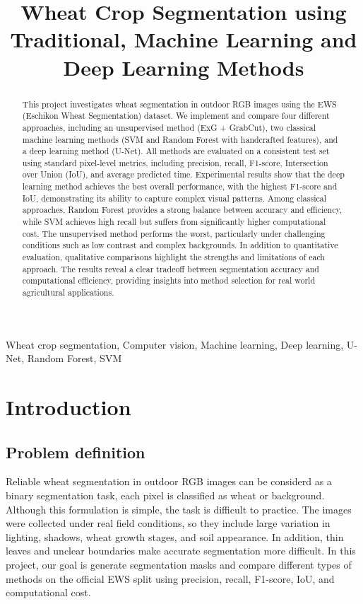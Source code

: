 \documentclass[conference]{IEEEtran}
\title{Wheat Crop Segmentation using Traditional, Machine Learning and Deep Learning Methods}
\author{

\IEEEauthorblockN{
Lucia Luo,
Yuze Chen,
Zi Wang,
Zhenhua Zhuo,
Zhiwei Gao
}
\IEEEauthorblockN{COMP9517, 26T1, UNSW}
\IEEEauthorblockN{z5465001, z5711364, z5518250, z5527323, z5542326@ad.unsw.edu.au}
}
\begin{document}
\maketitle

\begin{abstract}
This project investigates wheat segmentation in outdoor RGB images using the EWS (Eschikon Wheat Segmentation) dataset. We implement and compare four different approaches, including an unsupervised method (ExG + GrabCut), two classical machine learning methods (SVM and Random Forest with handcrafted features), and a deep learning method (U-Net).
 All methods are evaluated on a consistent test set using standard pixel-level metrics, including precision, recall, F1-score, Intersection over Union (IoU), and average predicted time. Experimental results show that the deep learning method achieves the best overall performance, with the highest F1-score and IoU, demonstrating its ability to capture complex visual patterns. Among classical approaches, Random Forest provides a strong balance between accuracy and efficiency, while SVM achieves high recall but suffers from significantly higher computational cost. The unsupervised method performs the worst, particularly under challenging conditions such as low contrast and complex backgrounds.
In addition to quantitative evaluation, qualitative comparisons highlight the strengths and limitations of each approach. The results reveal a clear tradeoff between segmentation accuracy and computational efficiency, providing insights into method selection for real world agricultural applications.

\end{abstract}

\begin{IEEEkeywords}
Wheat crop segmentation, Computer vision, Machine learning, Deep learning, U-Net, Random Forest, SVM
\end{IEEEkeywords}


\section{Introduction}

\subsection{Problem definition }
Reliable wheat segmentation in outdoor RGB images can be considerd as a binary segmentation task, each pixel is classified as wheat or background. Although this formulation is simple, the task is difficult to practice. The images were collected under real field conditions, so they include large variation in lighting, shadows, wheat growth stages, and soil appearance. In addition, thin leaves and unclear boundaries make accurate segmentation more difficult. In this project, our goal is generate segmentation masks and compare different types of methods on the official EWS split using precision, recall, F1-score, IoU, and computational cost. 
\end{document}
